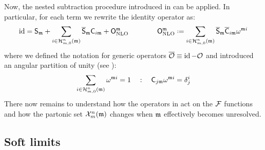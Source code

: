
Now, the nested subtraction procedure introduced in \cite{rontsch-2017} can be applied. In particular, for each term we rewrite the identity operator as:
\begin{equation}
  \id = \so_\ur + \sum_{i \in \prt{n}{m}(\ur)} \oso_\ur \co_{i\ur} + \nlo^\ur
  \qquad \qquad
  \nlo^\ur \defeq \sum_{i \in \prt{n}{m}(\ur)} \oso_\ur \oco_{i\ur} \omega^{\ur i}
  \label{eq:nest-sub}
\end{equation}
where we defined the notation for generic operators $ \overline{\mathcal{O}} \equiv \operatorname{id} - \mathcal{O} $ and introduced an angular partition of unity (see ):
\begin{equation}
  \sum_{i \in \mathcal{H}^{n}_{m,0}(\mathfrak{m})} \omega^{\mathfrak{m} i} = 1
  \quad : \quad
  \mathsf{C}_{j\mathfrak{m}} \omega^{\mathfrak{m} i} = \delta_j^i
  \label{eq:omega-part}
\end{equation}
There now remains to understand how the operators in  act on the $ \mathcal{F} $ functions and how the partonic set $ \mathcal{X}^{n}_{m}(\mathfrak{m}) $ changes when $ \mathfrak{m} $ effectively becomes unresolved.

\subsection{Soft limits}

